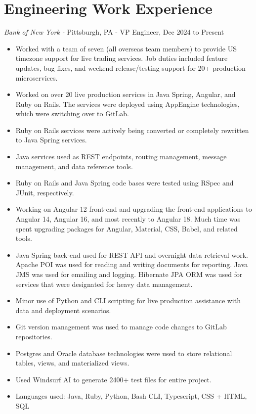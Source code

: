\documentclass[a4paper,10pt]{article}
\begin{document}
\section{Engineering Work Experience}
    {\sl Bank of New York -}{ Pittsburgh, PA - VP Engineer, Dec 2024 to Present}
        \begin{itemize}
            \item Worked with a team of seven (all overseas team members) to provide US timezone support for live trading services. Job duties included feature updates, bug fixes, and weekend release/testing support for 20+ production microservices.
            \item Worked on over 20 live production services in Java Spring, Angular, and Ruby on Rails. The services were deployed using AppEngine technologies, which were switching over to GitLab.
            \item Ruby on Rails services were actively being converted or completely rewritten to Java Spring services.
            \item Java services used as REST endpoints, routing management, message management, and data reference tools.
            \item Ruby on Rails and Java Spring code bases were tested using RSpec and JUnit, respectively.
            \item Working on Angular 12 front-end and upgrading the front-end applications to Angular 14, Angular 16, and most recently to Angular 18. Much time was spent upgrading packages for Angular, Material, CSS, Babel, and related tools.
            \item Java Spring back-end used for REST API and overnight data retrieval work. Apache POI was used for reading and writing documents for reporting. Java JMS was used for emailing and logging. Hibernate JPA ORM was used for services that were designated for heavy data management.
            \item Minor use of Python and CLI scripting for live production assistance with data and deployment scenarios.
            \item Git version management was used to manage code changes to GitLab repositories.
            \item Postgres and Oracle database technologies were used to store relational tables, views, and materialized views.
            \item Used Windsurf AI to generate 2400+ test files for entire project.
            \item Languages used: Java, Ruby, Python, Bash CLI, Typescript, CSS + HTML, SQL
        \end{itemize}
\end{document}
